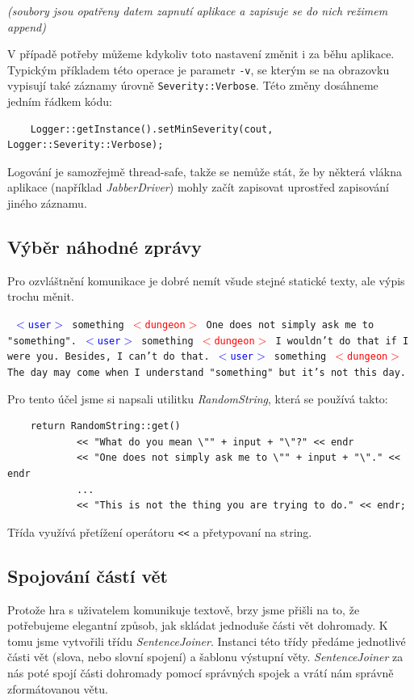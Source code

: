 \documentclass[11pt, a4paper]{article}
\def\class#1{\emph{#1}}
\newenvironment{example}%
{\smallskip\noindent\ignorespaces\obeylines\tt}%
{\smallskip\par\noindent
\ignorespacesafterend}
\def\user{\textcolor{blue}{$<$user$>$ }}
\def\dung{\textcolor{red}{$<$dungeon$>$ }}
\begin{document}
\noindent
\textit{(soubory jsou opatřeny datem zapnutí aplikace a zapisuje se do nich režimem append)}

\noindent
V případě potřeby můžeme kdykoliv toto nastavení změnit i za běhu aplikace. Typickým příkladem této operace je parametr \texttt{-v}, se kterým se na obrazovku vypisují také záznamy úrovně \texttt{Severity::Verbose}. Této změny dosáhneme jedním řádkem kódu:

\begin{lstlisting}
    Logger::getInstance().setMinSeverity(cout, Logger::Severity::Verbose);
\end{lstlisting}

\noindent
Logování je samozřejmě thread-safe, takže se nemůže stát, že by některá vlákna aplikace (například \class{JabberDriver}) mohly začít zapisovat uprostřed zapisování jiného záznamu.

\subsection{Výběr náhodné zprávy}

Pro ozvláštnění komunikace je dobré nemít všude stejné statické texty, ale výpis trochu měnit.

\begin{example}
\user something
\dung One does not simply ask me to "something".
\user something
\dung I wouldn't do that if I were you. Besides, I can't do that.
\user something
\dung The day may come when I understand "something"{} but it's not 
this day.
\end{example}

\noindent Pro tento účel jsme si napsali utilitku \class{RandomString}, která se používá takto:

\begin{lstlisting}
	return RandomString::get()
		    << "What do you mean \"" + input + "\"?" << endr
		    << "One does not simply ask me to \"" + input + "\"." << endr
		    ...
			<< "This is not the thing you are trying to do." << endr;
\end{lstlisting}

\noindent Třída využívá přetížení operátoru \texttt{<<} a přetypovaní na string.

\subsection{Spojování částí vět}

Protože hra s uživatelem komunikuje textově, brzy jsme přišli na to, že potřebujeme elegantní způsob, jak skládat jednoduše části vět dohromady. K tomu jsme vytvořili třídu \class{SentenceJoiner}. Instanci této třídy předáme jednotlivé části vět (slova, nebo slovní spojení) a šablonu výstupní věty. \class{SentenceJoiner} za nás poté spojí části dohromady pomocí správných spojek a vrátí nám správně zformátovanou větu.
\end{document}
